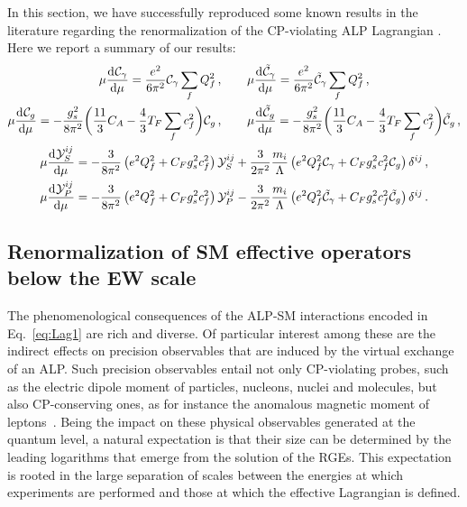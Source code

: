 In this section, we have successfully reproduced some known results in the literature regarding the renormalization of the CP-violating ALP Lagrangian \cite{Bauer:2021mvw, Chala:2020wvs, DasBakshi:2023lca}. Here we report a summary of our results:
\begin{gather}
    \mu\dv[]{\mathcal C_\gamma}{\mu} = \frac{e^2}{6\pi^2}\mathcal C_\gamma \sum_f Q_f^2\,,
    \qquad
    \mu\dv[]{\tilde{\mathcal C}_\gamma}{\mu} = \frac{e^2}{6\pi^2}\tilde{\mathcal C}_\gamma \sum_f Q_f^2\,,
    \\
    \mu\dv[]{\mathcal C_g}{\mu} = -\frac{g_s^2}{8\pi^2} \bigg(\frac{11}{3} C_A - \frac{4}{3}T_F \sum_f c_f^2\bigg) \mathcal C_g\,,
    \qquad
    \mu\dv[]{\tilde{\mathcal C}_g}{\mu} = -\frac{g_s^2}{8\pi^2} \bigg(\frac{11}{3} C_A - \frac{4}{3}T_F \sum_f c_f^2\bigg) \tilde{\mathcal C}_g \,,
    \\
    \mu\dv[]{\mathcal Y_S^{ij}}{\mu} = -\frac{3}{8\pi^2}\left(e^2Q_f^2+C_Fg_s^2c_f^2 \right)\mathcal Y_S^{ij} + \frac{3}{2\pi^2}\frac{m_i}{\Lambda}\left(e^2Q_f^2 \mathcal C_\gamma + C_F g_s^2 c_f^2 \mathcal C_g\right)\delta^{ij}\,,\\
    \mu\dv[]{\mathcal Y_P^{ij}}{\mu} = -\frac{3}{8\pi^2}\left(e^2Q_f^2 +C_Fg_s^2c_f^2 \right)\mathcal Y_P^{ij} - \frac{3}{2\pi^2}\frac{m_i}{\Lambda}\left(e^2Q_f^2 \tilde{\mathcal C}_\gamma + C_F g_s^2 c_f^2 \tilde{\mathcal C}_g\right)\delta^{ij}\,.
\end{gather}


\subsection{Renormalization of SM effective operators below the EW scale}
\label{subsec:LEFT}
%

The phenomenological consequences of the ALP-SM interactions encoded in Eq.~\eqref{eq:Lag1} are rich and diverse. Of particular interest among these are the indirect effects on precision observables that are induced by the virtual exchange of an ALP. Such precision observables entail not only CP-violating probes, such as the electric dipole moment of particles, nucleons, nuclei and molecules, but also CP-conserving ones, as for instance the anomalous magnetic moment of leptons~\cite{Marciano:2016yhf,DiLuzio:2020oah}. 
Being the impact on these physical observables generated at the quantum level, a natural expectation is that their size can be determined by the leading logarithms that emerge from 
the solution of the RGEs. This expectation is rooted in the large separation of scales between the energies at which experiments are performed and those at which the effective Lagrangian is defined. 

